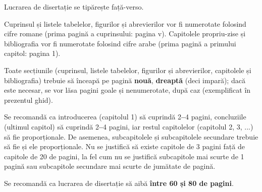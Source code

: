 Lucrarea de disertație se tipărește față-verso.

Cuprinsul și listele tabelelor, figurilor și abrevierilor vor fi numerotate folosind cifre romane (prima pagină a cuprinsului: pagina v). Capitolele propriu-zise și bibliografia vor fi numerotate folosind cifre arabe (prima pagină a primului capitol: pagina 1).

Toate secțiunile (cuprinsul, listele tabelelor, figurilor și abrevierilor, capitolele și bibliografia) trebuie să înceapă pe pagină \textbf{nouă}, \textbf{dreaptă} (deci impară); dacă este necesar, se vor lăsa pagini goale și nenumerotate, după caz (exemplificat în prezentul ghid).

Se recomandă ca introducerea (capitolul 1) să cuprindă 2\textbf{--}4 pagini, concluziile (ultimul capitol) să cuprindă 2\textbf{--}4 pagini, iar restul capitolelor (capitolul 2, 3, ...) să fie proporționale. De asemenea, subcapitolele și subcapitolele secundare trebuie să fie și ele proporționale. Nu se justifică să existe capitole de 3 pagini față de capitole de 20 de pagini, la fel cum nu se justifică subcapitole mai scurte de 1 pagină sau subcapitole secundare mai scurte de jumătate de pagină.

Se recomandă ca lucrarea de disertație să aibă \textbf{între 60 și 80 de pagini}.







